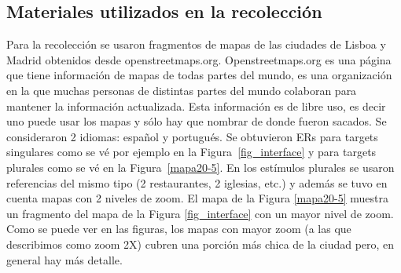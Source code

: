\subsection{Materiales utilizados en la recolecci\'on}
\label{corpus-materiales}

Para la recolecci\'on se usaron fragmentos de mapas de las ciudades de Lisboa y Madrid obtenidos desde openstreetmaps.org. Openstreetmaps.org es una p\'agina que tiene informaci\'on de mapas de todas partes del mundo, es una organizaci\'on en la que muchas personas de distintas partes del mundo colaboran para mantener la informaci\'on actualizada. Esta informaci\'on es de libre uso, es decir uno puede usar los mapas y s\'olo hay que nombrar de donde fueron sacados.
Se consideraron 2 idiomas: espa\~nol y portugu\'es. Se obtuvieron ERs para targets singulares como se v\'e por ejemplo en la Figura~\ref{fig_interface} y para targets plurales como se v\'e en la Figura~\ref{mapa20-5}. En los est\'imulos plurales se usaron referencias del mismo tipo (2 restaurantes, 2 iglesias, etc.) y adem\'as se tuvo en cuenta mapas con 2 niveles de zoom. El mapa de la Figura \ref{mapa20-5} muestra un fragmento del mapa de la Figura \ref{fig_interface} con un mayor nivel de zoom. Como se puede ver en las figuras, los mapas con mayor zoom (a las que describimos como zoom 2X) cubren una porci\'on m\'as chica de la ciudad pero, en general hay m\'as detalle.




